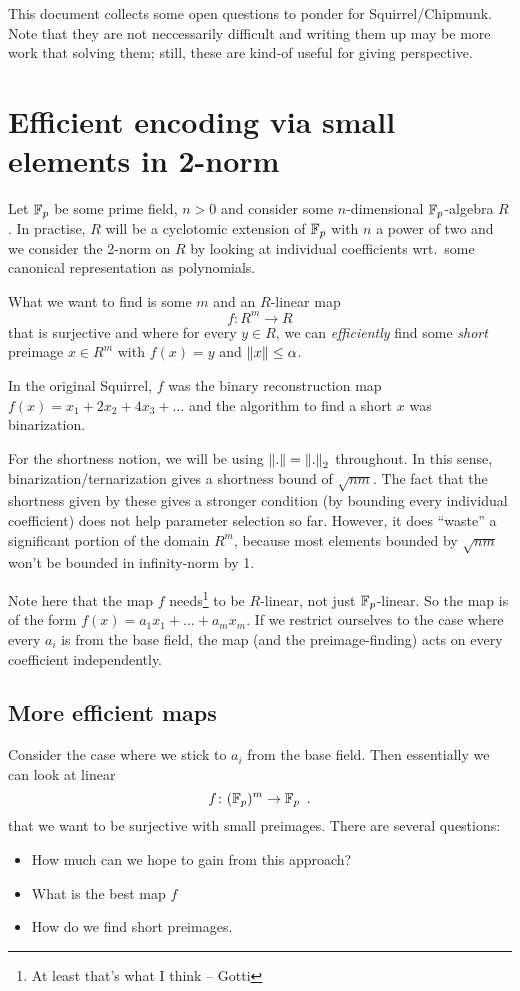 \documentclass{article}
\begin{document}
This document collects some open questions to ponder for Squirrel/Chipmunk. Note that they are not neccessarily difficult and writing them up may be more work that solving them;
still, these are kind-of useful for giving perspective.

\section{Efficient encoding via small elements in 2-norm}

Let ${\mathbb{F}}_p$ be some prime field, $n>0$ and consider some $n$-dimensional ${\mathbb{F}}_p$-algebra $R$. In practise, $R$ will be a cyclotomic extension of ${\mathbb{F}}_p$ with $n$ a power of two and we consider the 2-norm on $R$ by looking at individual coefficients wrt.\ some canonical representation as polynomials.

What we want to find is some $m$ and an $R$-linear map
\[
 f\colon R^m \to R
\]
that is surjective and where for every $y\in R$, we can \emph{efficiently} find some \emph{short} preimage $x\in R^m$ with $f(x) = y$ and ${\lVert{x}\rVert}\leq \alpha$.

In the original Squirrel, $f$ was the binary reconstruction map $f(x) = x_1 + 2x_2 + 4x_3+ \ldots$ and the algorithm to find a short $x$ was binarization.

For the shortness notion, we will be using ${\lVert{.}\rVert} = {\lVert{.}\rVert}_2$ throughout. In this sense, binarization/ternarization gives a shortness bound of $\sqrt{nm}$.
The fact that the shortness given by these gives a stronger condition (by bounding every individual coefficient) does not help parameter selection so far.
However, it does ``waste'' a significant portion of the domain $R^m$, because most elements bounded by $\sqrt{nm}$ won't be bounded in infinity-norm by 1.

Note here that the map $f$ needs\footnote{At least that's what I think -- Gotti} to be $R$-linear, not just ${\mathbb{F}}_p$-linear. So the map is of the form $f(x) = a_1 x_1 + \ldots + a_m x_m$.
If we restrict ourselves to the case where every $a_i$ is from the base field, the map (and the preimage-finding) acts on every coefficient independently.

\subsection{More efficient maps}
Consider the case where we stick to $a_i$ from the base field. Then essentially we can look at linear
\[
    f\colon ({\mathbb{F}}_p)^m \to {\mathbb{F}}_p\enspace.
\]
that we want to be surjective with small preimages. There are several questions:
\begin{itemize}
 \item How much can we hope to gain from this approach?
 \item What is the best map $f$
 \item How do we find short preimages.
\end{itemize}
\end{document}
